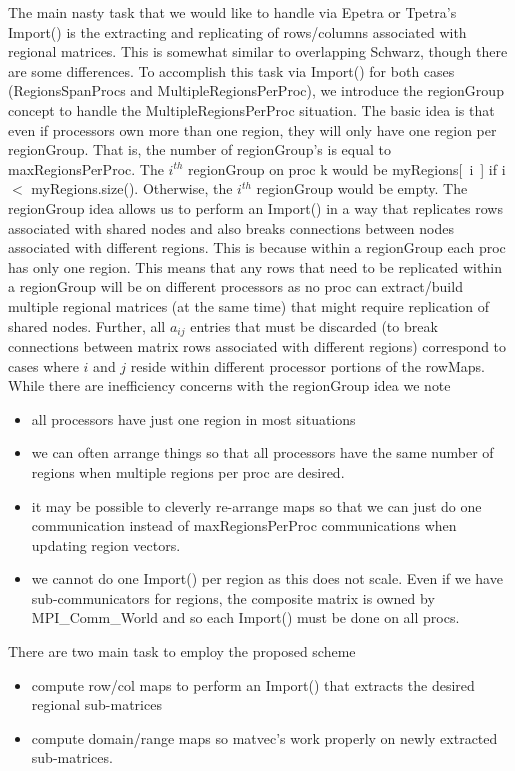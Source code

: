 \documentclass[11pt]{article}
\begin{document}
The main nasty task that we would like to handle via Epetra or Tpetra's Import() is the
extracting and replicating of rows/columns associated with regional matrices. This is
somewhat similar to overlapping Schwarz, though there are some differences. To accomplish
this task via Import() for both cases ({\sf RegionsSpanProcs } and
{\sf MultipleRegionsPerProc}), we introduce the  {\sf regionGroup} concept
to handle the {\sf MultipleRegionsPerProc}
situation. The basic idea is that even if processors own more than one region, they
will only have one region per {\sf regionGroup}. That is, the number of {\sf regionGroup}'s is equal to
{\sf maxRegionsPerProc}. The $i^{th}$ {\sf regionGroup} on proc k would be
{\sf myRegions[~i~]} if
i $<$ {\sf myRegions.size()}. Otherwise, the $i^{th}$ {\sf regionGroup} would be empty.
The {\sf regionGroup} idea allows us to perform an Import() in a way that replicates rows
associated with shared nodes and also breaks connections between nodes associated
with different regions. This is because within a {\sf regionGroup} each proc has only one
region. This means that any rows that need to be replicated within a {\sf regionGroup} will be on different processors as no proc can extract/build
multiple regional matrices (at the same time) that might require replication
of shared nodes.
Further, all $a_{ij}$ entries that must be discarded (to break connections between
matrix rows associated with different regions) correspond to cases where $i$
and $j$ reside within different processor portions of the rowMaps.
While there are inefficiency concerns with the {\sf regionGroup} idea we note
\begin{itemize}
   \item all processors have just one region in most situations
   \item we can often arrange things so that all processors have the
         same number of regions when multiple regions per proc are desired.
   \item it may be possible to cleverly re-arrange maps so that we can just do
      one communication instead of {\sf maxRegionsPerProc} communications when
      updating region vectors.
   \item we cannot do one Import() per region as this does not scale. Even if we have sub-communicators for regions, the composite matrix is owned by MPI\_Comm\_World and so each Import() must be done on all procs.
\end{itemize}
There are two main task to employ the proposed scheme
\begin{itemize}
   \item compute row/col maps to perform an Import() that extracts
      the desired regional sub-matrices

   \item compute  domain/range maps so matvec's work properly on newly
      extracted sub-matrices.
\end{itemize}
\end{document}
